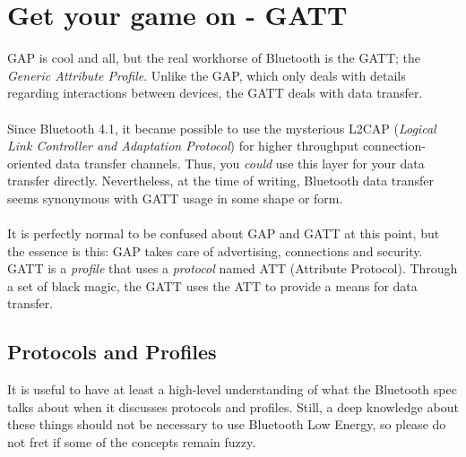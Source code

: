 \documentclass[11pt,a4paper]{article}
\begin{document}
\section{Get your game on - GATT}
GAP is cool and all, but the real workhorse of Bluetooth is the GATT; the \textit{Generic Attribute Profile}. Unlike the GAP, which only deals with details regarding interactions between devices, the GATT deals with data transfer.\\
\\
Since Bluetooth 4.1, it became possible to use the mysterious L2CAP (\textit{Logical Link Controller and Adaptation Protocol}) for higher throughput connection-oriented data transfer channels. Thus, you \textit{could} use this layer for your data transfer directly. Nevertheless, at the time of writing, Bluetooth data transfer seems synonymous with GATT usage in some shape or form.
\\
\\
It is perfectly normal to be confused about GAP and GATT at this point, but the essence is this: GAP takes care of advertising, connections and security. GATT is a \textit{profile} that uses a \textit{protocol} named ATT (Attribute Protocol). Through a set of black magic, the GATT uses the ATT to provide a means for data transfer.

\subsection{Protocols and Profiles}
It is useful to have at least a high-level understanding of what the Bluetooth spec talks about when it discusses protocols and profiles. Still, a deep knowledge about these things should not be necessary to use Bluetooth Low Energy, so please do not fret if some of the concepts remain fuzzy.
\end{document}
